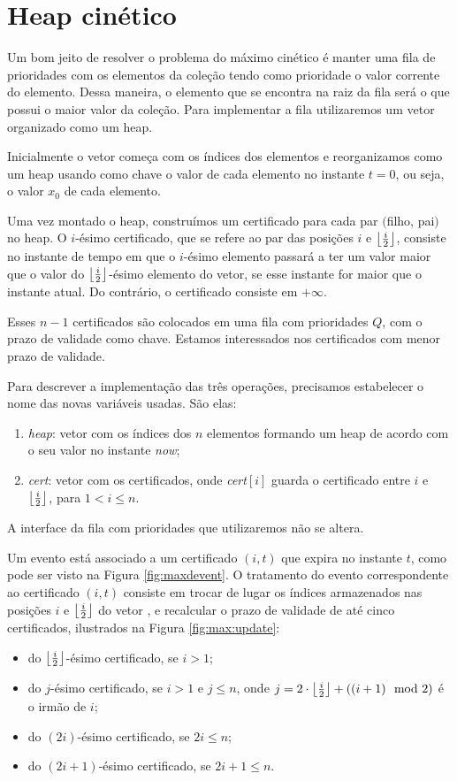 
\section{Heap cinético}
\label{heap:secao}
Um bom jeito de resolver o problema do máximo cinético é manter uma fila de
prioridades com os elementos da coleção tendo como prioridade o valor corrente
do elemento. Dessa maneira, o elemento que se encontra na raiz da fila será o
que possui o maior valor da coleção. Para implementar a fila utilizaremos um
vetor organizado como um heap.

Inicialmente o vetor começa com os índices dos elementos e reorganizamos como um
heap usando como chave o valor de cada elemento no instante $t = 0$, ou seja, o
valor $x_0$ de cada elemento.

Uma vez montado o heap, construímos um certificado para cada par $($filho,
pai$)$ no heap. O $i$-ésimo certificado, que se refere ao par das posições $i$ e
$\left\lfloor \frac{i}{2} \right\rfloor$, consiste no instante de tempo em que o $i$-ésimo elemento
passará a ter um valor maior que o valor do $\left\lfloor \frac{i}{2} \right\rfloor$-ésimo elemento
do vetor, se esse instante for maior que o instante atual. Do contrário, o
certificado consiste em $+\infty$.

Esses $n - 1$ certificados são colocados em uma fila com prioridades $Q$, com o
prazo de validade como chave. Estamos interessados nos certificados com menor
prazo de validade.

Para descrever a implementação das três operações, precisamos estabelecer o nome
das novas variáveis usadas. São elas:
\begin{enumerate}
    \item \textit{heap}: vetor com os índices dos $n$ elementos
    formando um heap de acordo com o seu valor no instante
    \textit{now};
    \item \textit{cert}: vetor com os certificados, onde
    \textit{cert}$[i]$ guarda o certificado entre $i$ e
    $\left\lfloor \frac{i}{2} \right\rfloor$, para $1 < i \leq n$.
\end{enumerate}

A interface da fila com prioridades que utilizaremos não se altera.

Um evento está associado a um certificado $(i, t)$ que expira no instante $t$,
como pode ser visto na Figura \ref{fig:maxdevent}. O tratamento do evento
correspondente ao certificado $(i, t)$ consiste em trocar de lugar os índices
armazenados nas posições $i$ e $\left\lfloor \frac{i}{2} \right\rfloor$ do vetor \heap, e
recalcular o prazo de validade de até cinco certificados, ilustrados na Figura
\ref{fig:max:update}:
\begin{itemize}
    \item do $\left\lfloor \frac{i}{2} \right\rfloor$-ésimo certificado, se $i > 1$;
    \item do $j$-ésimo certificado, se $i > 1$ e $j \leq n$,
    onde $j = 2\cdot \left\lfloor \frac{i}{2} \right\rfloor + ((i + 1)\mod2)$
    é o irmão de $i$;
    \item do $(2i)$-ésimo certificado, se $2i \leq n$;
    \item do $(2i + 1)$-ésimo certificado, se $2i + 1 \leq n$.
\end{itemize}


